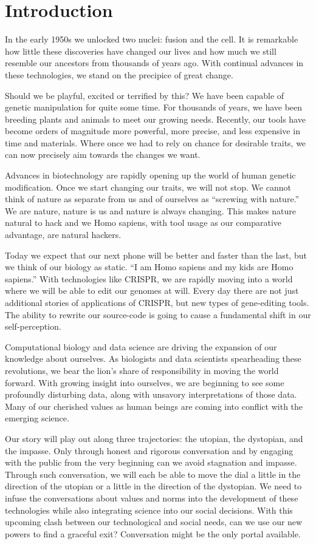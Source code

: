 \section{Introduction}
\label{sec:introduction}

In the early 1950s we unlocked two nuclei: fusion and the cell.
It is remarkable how little these discoveries have changed our lives and how much we still resemble our ancestors from thousands of years ago.
With continual advances in these technologies, we stand on the precipice of great change.

Should we be playful, excited or terrified by this?
We have been capable of genetic manipulation for quite some time.
For thousands of years, we have been breeding plants and animals to meet our growing needs.
Recently, our tools have become orders of magnitude more powerful, more precise, and less expensive in time and materials.
Where once we had to rely on chance for desirable traits, we can now precisely aim towards the changes we want.

Advances in biotechnology are rapidly opening up the world of human genetic modification.
Once we start changing our traits, we will not stop.
We cannot think of nature as separate from us and of ourselves as ``screwing with nature.''
We are nature, nature is us and nature is always changing.
This makes nature natural to hack and we Homo sapiens, with tool usage as our comparative advantage, are natural hackers.

Today we expect that our next phone will be better and faster than the last, but we think of our biology as static.
``I am Homo sapiens and my kids are Homo sapiens.''
With technologies like CRISPR, we are rapidly moving into a world where we will be able to edit our genomes at will.
Every day there are not just additional stories of applications of CRISPR, but new types of gene-editing tools.
The ability to rewrite our source-code is going to cause a fundamental shift in our self-perception.

Computational biology and data science are driving the expansion of our knowledge about ourselves.
As biologists and data scientists spearheading these revolutions, we bear the lion's share of responsibility in moving the world forward.
With growing insight into ourselves, we are beginning to see some profoundly disturbing data, along with unsavory interpretations of those data.
Many of our cherished values as human beings are coming into conflict with the emerging science.

Our story will play out along three trajectories: the utopian, the dystopian, and the impasse.
Only through honest and rigorous conversation and by engaging with the public from the very beginning can we avoid stagnation and impasse.
Through such conversation, we will each be able to move the dial a little in the direction of the utopian or a little in the direction of the dystopian.
We need to infuse the conversations about values and norms into the development of these technologies while also integrating science into our social decisions.
With this upcoming clash between our technological and social needs, can we use our new powers to find a graceful exit?
Conversation might be the only portal available.

